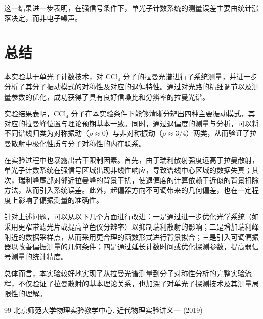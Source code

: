 \documentclass[a4paper]{ctexart}
\begin{document}
这一结果进一步表明，在强信号条件下，单光子计数系统的测量误差主要由统计涨落决定，而非电子噪声。

    \section{总结}

本实验基于单光子计数技术，对 CCl$_4$ 分子的拉曼光谱进行了系统测量，并进一步分析了其分子振动模式的对称性及对应的退偏特性。通过对光路的精细调节以及测量参数的优化，成功获得了具有良好信噪比和分辨率的拉曼光谱。

实验结果表明，CCl$_4$ 分子在本实验条件下能够清晰分辨出四种主要振动模式，其对应的拉曼峰位置与理论预期基本一致。同时，通过退偏度的测量与分析，可以将不同谱线归类为对称振动（$\rho \approx 0$）与非对称振动（$\rho \approx 3/4$）两类，从而验证了拉曼散射中极化性质与分子对称性的内在联系。

在实验过程中也暴露出若干限制因素。首先，由于瑞利散射强度远高于拉曼散射，单光子计数系统在强信号区域出现非线性响应，导致谱线中心区域的数据失真；其次，瑞利峰尾部对邻近拉曼峰的背景干扰，使退偏度的计算依赖于近似的背景扣除方法，从而引入系统误差。此外，起偏器方向不可调带来的几何偏差，也在一定程度上影响了偏振测量的准确性。

针对上述问题，可以从以下几个方面进行改进：一是通过进一步优化光学系统（如采用更窄带滤光片或提高单色仪分辨率）以抑制瑞利散射的影响；二是增加瑞利峰附近的数据采样点，从而采用更合理的函数形式进行背景拟合；三是引入可调偏振器以改善偏振测量的几何条件；四是通过延长计数时间或优化探测参数，提高弱信号测量的统计精度。

总体而言，本实验较好地实现了从拉曼光谱测量到分子对称性分析的完整实验流程，不仅验证了拉曼散射的基本理论关系，也加深了对单光子探测技术及其测量局限性的理解。
   
    \begin{thebibliography}{99}
        北京师范大学物理实验教学中心. 近代物理实验讲义一 (2019)
    \end{thebibliography}
\end{document}
